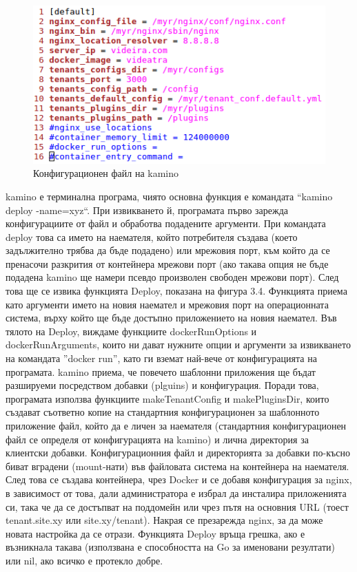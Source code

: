 \documentclass[pdftex,14pt,a4paper]{extreport}
\begin{document}
\begin{figure}[h]
  \centering
  \includegraphics[scale=0.8]{./snippets/config}
  \caption{Конфигурационен файл на kamino}
\end{figure}
kamino е терминална програма, чиято основна функция е командата ``kamino deploy -name=xyz``. При извикването й, програмата първо зарежда конфигурациите от файл и обработва подадените аргументи. При командата deploy това са името на наемателя, който потребителя създава (което задължително трябва да бъде подадено) или мрежовия порт, към който да се пренасочи разкрития от контейнера мрежови порт (ако такава опция не бъде подадена kamino ще намери псевдо произволен свободен мрежови порт). След това ще се извика функцията Deploy, показана на фигура 3.4. Функцията приема като аргументи името на новия наемател и мрежовия порт на операционната система, върху който ще бъде достъпно приложението на новия наемател. Във тялото на Deploy, виждаме функциите dockerRunOptions и dockerRunArguments, които ни дават нужните опции и аргументи за извикването на командата ''docker run'', като ги вземат най-вече от конфигурацията на програмата. kamino приема, че повечето шаблонни приложения ще бъдат разшируеми посредством добавки (plguins) и конфигурация. Поради това, програмата използва функциите makeTenantConfig и makePluginsDir, които създават съответно копие на стандартния конфигурационен за шаблонното приложение файл, който да е личен за наемателя (стандартния конфигурационен файл се определя от конфигурацията на kamino) и лична директория за клиентски добавки. Конфигурационния файл и директорията за добавки по-късно биват вградени (mount-нати) във файловата система на контейнера на наемателя. След това се създава контейнера, чрез Docker и се добавя конфигурация за nginx, в зависимост от това, дали администратора е избрал да инсталира приложенията си, така че да се достъпват на поддомейн или чрез пътя на основния URL (тоест tenant.site.xy или site.xy/tenant). Накрая се презарежда nginx, за да може новата настройка да се отрази. Функцията Deploy връща грешка, ако е възникнала такава (използвана е способността на Go за именовани резултати) или nil, ако всичко е протекло добре.
\end{document}
